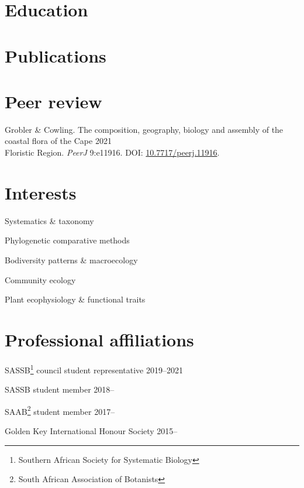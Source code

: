 \documentclass[10pt]{article}
\begin{document}

\section*{Education} %



\section*{Publications} %



\section*{Peer review} %

Grobler \& Cowling. The composition, geography, biology and assembly of the
  coastal flora of the Cape                                       \hfill 2021 \\
  \hspace{2em} Floristic Region. \textit{PeerJ} 9:e11916. DOI:
    \href{https://doi.org/10.7717/peerj.11916}{10.7717/peerj.11916}.

\hfill

\begin{multicols}{2}

\section*{Interests} %
    
Systematics \& taxonomy

Phylogenetic comparative methods

Bodiversity patterns \& macroecology

Community ecology

Plant ecophysiology \& functional traits

\section*{Professional affiliations} %

SASSB\footnote{Southern African Society for Systematic Biology}
council student representative                                 \hfill 2019--2021

SASSB student member                                               \hfill 2018--

SAAB\footnote{South African Association of Botanists}
student member                                                     \hfill 2017--

Golden Key International Honour Society                            \hfill 2015--

\end{multicols}
\end{document}
